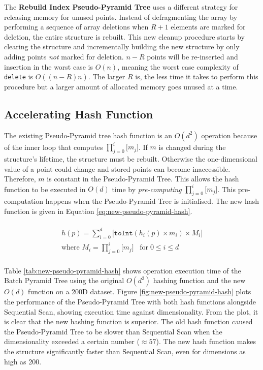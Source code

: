 The \textbf{Rebuild Index Pseudo-Pyramid Tree} uses a different strategy for releasing memory for unused points. Instead of defragmenting the array by performing a sequence of array deletions when $R + 1$ elements are marked for deletion, the entire structure is rebuilt. This new cleanup procedure starts by clearing the structure and incrementally building the new structure by only adding points \textit{not} marked for deletion. $n - R$ points will be re-inserted and insertion in the worst case is $O(n)$, meaning the worst case complexity of \texttt{delete} is $O((n - R)n)$. The larger $R$ is, the less time it takes to perform this procedure but a larger amount of allocated memory goes unused at a time.

\subsection{Accelerating Hash Function}

The existing Pseudo-Pyramid tree hash function is an $O(d^2)$ operation because of the inner loop that computes $\prod_{j=0}^{i}{\lbrack m_j \rbrack}$. If $m$ is changed during the structure's lifetime, the structure must be rebuilt. Otherwise the one-dimensional value of a point could change and stored points can become inaccessible. Therefore, $m$ is constant in the Pseudo-Pyramid Tree. This allows the hash function to be executed in $O(d)$ time by \textit{pre-computing} $\prod_{j=0}^{i}{\lbrack m_j \rbrack}$. This pre-computation happens when the Pseudo-Pyramid Tree is initialised. The new hash function is given in Equation \ref{eq:new-pseudo-pyramid-hash}.

\begin{multline}\\
	h(p) = \sum_{i = 0}^{d} { \lbrack \texttt{toInt}( h_i(p) \times m_i ) \times M_i \rbrack } \\
	\text{where } M_i = \prod_{j=0}^{i}{\lbrack m_j \rbrack} \;\;\; \text{for} \; 0 \leq i \leq d \\
	\label{eq:new-pseudo-pyramid-hash}
\end{multline}

Table \ref{tab:new-pseudo-pyramid-hash} shows operation execution time of the Batch Pyramid Tree using the original $O(d^2)$ hashing function and the new $O(d)$ function on a 200D dataset. Figure \ref{fig:new-pseudo-pyramid-hash} plots the performance of the Pseudo-Pyramid Tree with both hash functions alongside Sequential Scan, showing execution time against dimensionality. From the plot, it is clear that the new hashing function is superior. The old hash function caused the Pseudo-Pyramid Tree to be slower than Sequential Scan when the dimensionality exceeded a certain number ($\approx 57$). The new hash function makes the structure significantly faster than Sequential Scan, even for dimensions as high as 200.

